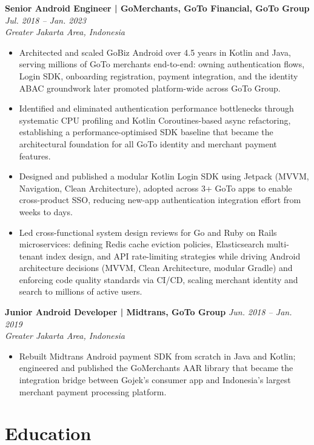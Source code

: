 \documentclass[10pt]{article}
\begin{document}
\vspace{2pt}
\textbf{Senior Android Engineer | GoMerchants, GoTo Financial, GoTo Group} \hfill \textit{Jul. 2018 -- Jan. 2023}\\
\textit{Greater Jakarta Area, Indonesia}
\begin{itemize}
\item Architected and scaled GoBiz Android over 4.5 years in Kotlin and Java, serving millions of GoTo merchants end-to-end: owning authentication flows, Login SDK, onboarding registration, payment integration, and the identity ABAC groundwork later promoted platform-wide across GoTo Group.
\item Identified and eliminated authentication performance bottlenecks through systematic CPU profiling and Kotlin Coroutines-based async refactoring, establishing a performance-optimised SDK baseline that became the architectural foundation for all GoTo identity and merchant payment features.
\item Designed and published a modular Kotlin Login SDK using Jetpack (MVVM, Navigation, Clean Architecture), adopted across 3+ GoTo apps to enable cross-product SSO, reducing new-app authentication integration effort from weeks to days.
\item Led cross-functional system design reviews for Go and Ruby on Rails microservices: defining Redis cache eviction policies, Elasticsearch multi-tenant index design, and API rate-limiting strategies while driving Android architecture decisions (MVVM, Clean Architecture, modular Gradle) and enforcing code quality standards via CI/CD, scaling merchant identity and search to millions of active users.
\end{itemize}

\vspace{2pt}
\textbf{Junior Android Developer | Midtrans, GoTo Group} \hfill \textit{Jun. 2018 -- Jan. 2019}\\
\textit{Greater Jakarta Area, Indonesia}
\begin{itemize}
\item Rebuilt Midtrans Android payment SDK from scratch in Java and Kotlin; engineered and published the GoMerchants AAR library that became the integration bridge between Gojek's consumer app and Indonesia's largest merchant payment processing platform.
\end{itemize}

\section*{Education}
\end{document}
